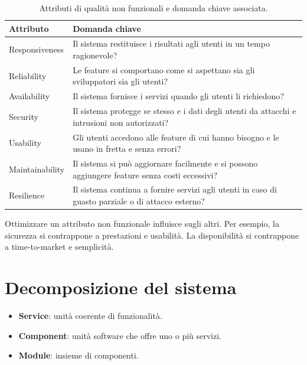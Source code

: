 \begin{table}[ht]
\centering
\small
\caption{Attributi di qualità non funzionali e domanda chiave associata.}
\label{tab:arch-nonfunzionali}
\begin{tabularx}{\linewidth}{>{\raggedright\arraybackslash}p{3.2cm}X}
\toprule
Attributo & Domanda chiave \\
\midrule
Responsiveness & Il sistema restituisce i risultati agli utenti in un tempo ragionevole? \\
Reliability & Le feature si comportano come si aspettano sia gli sviluppatori sia gli utenti? \\
Availability & Il sistema fornisce i servizi quando gli utenti li richiedono? \\
Security & Il sistema protegge se stesso e i dati degli utenti da attacchi e intrusioni non autorizzati? \\
Usability & Gli utenti accedono alle feature di cui hanno bisogno e le usano in fretta e senza errori? \\
Maintainability & Il sistema si può aggiornare facilmente e si possono aggiungere feature senza costi eccessivi? \\
Resilience & Il sistema continua a fornire servizi agli utenti in caso di guasto parziale o di attacco esterno? \\
\bottomrule
\end{tabularx}
\end{table}

\begin{attenzione}[Compromessi]
Ottimizzare un attributo non funzionale influisce sugli altri. Per esempio, la sicurezza si contrappone a prestazioni e
usabilità. La disponibilità si contrappone a time-to-market e semplicità.
\end{attenzione}

\section{Decomposizione del sistema}
\label{sec:arch-decomposizione}

\begin{definizione}
\begin{itemize}
  \item \textbf{Service}: unità coerente di funzionalità.
  \item \textbf{Component}: unità software che offre uno o più servizi.
  \item \textbf{Module}: insieme di componenti.
\end{itemize}
\end{definizione}

